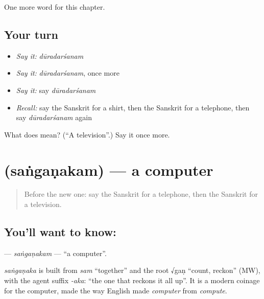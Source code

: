 \begin{grammarlens}[title={What you've built}]
One more word for this chapter.
\end{grammarlens}

\subsection*{Your turn}
\begin{itemize}
\raggedright
  \item \emph{Say it:} \emph{dūradarśanam}
  \item \emph{Say it:} \emph{dūradarśanam}, once more
  \item \emph{Say it:} say \emph{dūradarśanam}
  \item \emph{Recall:} say the Sanskrit for a shirt, then the Sanskrit for a telephone, then say \emph{dūradarśanam} again
\end{itemize}

\begin{tcolorbox}[breakable,colback=teal!4,colframe=teal!35!black,title={Before you move on}]
What does  mean? (\textquotedblleft{}A television\textquotedblright{}.) Say it once more.
\end{tcolorbox}
\section[\texorpdfstring{\sk{संगणकम्} (saṅgaṇakam)}{संगणकम् (saṅgaṇakam)}]{ (saṅgaṇakam) — a computer}

\label{lesson:SA-C105-sanganakam}



\begin{quote}
Before the new one: say the Sanskrit for a telephone, then the Sanskrit for a television.
\end{quote}

\subsection*{You'll want to know: }
\textbf{} — \emph{saṅgaṇakam} — \textquotedblleft{}a computer\textquotedblright{}.

\begin{cousinweb}
\emph{saṅgaṇaka} is built from \emph{sam} \textquotedblleft{}together\textquotedblright{} and the root √gaṇ \textquotedblleft{}count, reckon\textquotedblright{} (MW), with the agent suffix \emph{-aka}: \textquotedblleft{}the one that reckons it all up\textquotedblright{}. It is a modern coinage for the computer, made the way English made \emph{computer} from \emph{compute}.
\end{cousinweb}

